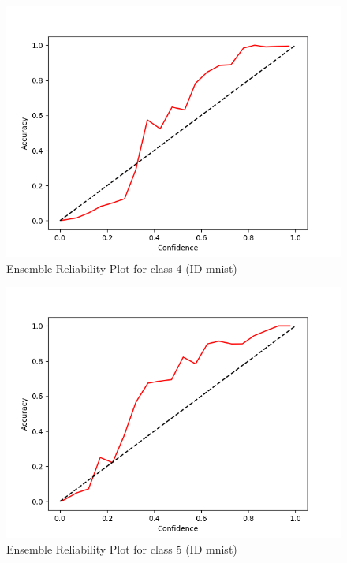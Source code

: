 \documentclass[11pt]{article}
\begin{document}
\begin{figure}[htbp]
\centering
\includegraphics[width=.9\linewidth]{./ens_mnist_rel_4.png}
\caption{\label{fig:org14e7042}
Ensemble Reliability Plot for class 4 (ID mnist)}
\end{figure}

\begin{figure}[htbp]
\centering
\includegraphics[width=.9\linewidth]{./ens_mnist_rel_5.png}
\caption{\label{fig:orgfde6cc2}
Ensemble Reliability Plot for class 5 (ID mnist)}
\end{figure}
\end{document}
